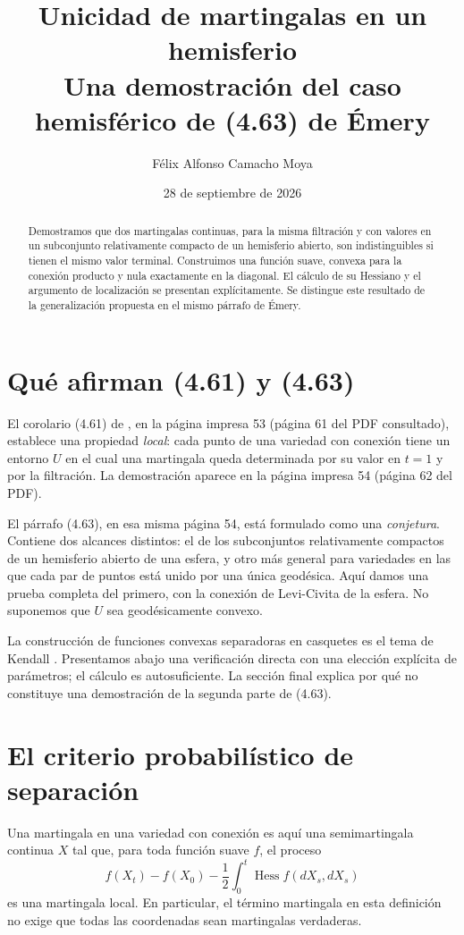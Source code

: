 \documentclass[11pt,a4paper]{article}
\title{Unicidad de martingalas en un hemisferio\\\large Una demostración del caso hemisférico de (4.63) de Émery}
\author{Félix Alfonso Camacho Moya}
\date{28 de septiembre de 2026}
\DeclareMathOperator{\Hess}{Hess}
\begin{document}
\maketitle
\begin{abstract}
Demostramos que dos martingalas continuas, para la misma filtración y con valores en un subconjunto relativamente compacto de un hemisferio abierto, son indistinguibles si tienen el mismo valor terminal. Construimos una función suave, convexa para la conexión producto y nula exactamente en la diagonal. El cálculo de su Hessiano y el argumento de localización se presentan explícitamente. Se distingue este resultado de la generalización propuesta en el mismo párrafo de Émery.
\end{abstract}

\section{Qué afirman (4.61) y (4.63)}
El corolario (4.61) de \cite{emery}, en la página impresa 53 (página 61 del PDF consultado), establece una propiedad \emph{local}: cada punto de una variedad con conexión tiene un entorno $U$ en el cual una martingala queda determinada por su valor en $t=1$ y por la filtración. La demostración aparece en la página impresa 54 (página 62 del PDF).

El párrafo (4.63), en esa misma página 54, está formulado como una \emph{conjetura}. Contiene dos alcances distintos: el de los subconjuntos relativamente compactos de un hemisferio abierto de una esfera, y otro más general para variedades en las que cada par de puntos está unido por una única geodésica. Aquí damos una prueba completa del primero, con la conexión de Levi-Civita de la esfera. No suponemos que $U$ sea geodésicamente convexo.

La construcción de funciones convexas separadoras en casquetes es el tema de Kendall \cite{kendall}. Presentamos abajo una verificación directa con una elección explícita de parámetros; el cálculo es autosuficiente. La sección final explica por qué no constituye una demostración de la segunda parte de (4.63).

\section{El criterio probabilístico de separación}
Una martingala en una variedad con conexión es aquí una semimartingala continua $X$ tal que, para toda función suave $f$, el proceso
\[
 f(X_t)-f(X_0)-\frac12\int_0^t\Hess f(dX_s,dX_s)
\]
es una martingala local. En particular, el término martingala en esta definición no exige que todas las coordenadas sean martingalas verdaderas.
\end{document}

